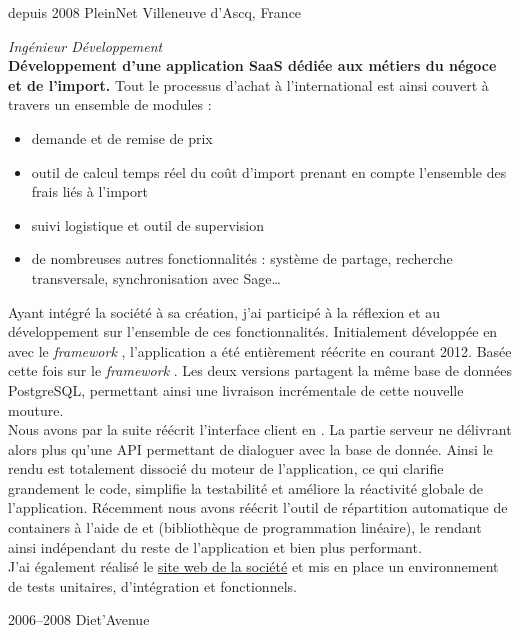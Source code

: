 \documentclass[]{cv} %
\begin{document}
\begin{entrylist}
\entry
{depuis 2008}
{PleinNet}
{Villeneuve d'Ascq, France}
{\emph{Ingénieur Développement}
\vspace{5pt}\\
\textbf{Développement d'une application SaaS dédiée aux métiers du négoce et de l'import.} Tout le processus d'achat à l'international est ainsi couvert à travers un ensemble de modules :
\begin{itemize}
\item demande et de remise de prix
\item outil de calcul temps réel du coût d'import prenant en compte l'ensemble des frais liés à l'import
\item suivi logistique et outil de supervision
\item de nombreuses autres fonctionnalités : système de partage, recherche transversale, synchronisation avec Sage…
\end{itemize}
\vspace{5pt}
Ayant intégré la société à sa création, j'ai participé à la réflexion et au développement sur l'ensemble de ces fonctionnalités. Initialement développée en  avec le \emph{framework} , l'application a été entièrement réécrite en  courant 2012. Basée cette fois sur le \emph{framework} . Les deux versions partagent la même base de données PostgreSQL, permettant ainsi une livraison incrémentale de cette nouvelle mouture.
\vspace{5pt}\\
Nous avons par la suite réécrit l'interface client en . La partie serveur ne délivrant alors plus qu'une API permettant de dialoguer avec la base de donnée. Ainsi le rendu est totalement dissocié du moteur de l'application, ce qui clarifie grandement le code, simplifie la testabilité et améliore la réactivité globale de l'application.
Récemment nous avons réécrit l'outil de répartition automatique de containers à l'aide de  et  (bibliothèque de programmation linéaire), le rendant ainsi indépendant du reste de l'application et bien plus performant.
\vspace{5pt}\\
J'ai également réalisé le \href{http://www.geniustrade.com}{site web de la société} et mis en place un environnement de tests unitaires, d'intégration et fonctionnels.
}
\entry
{2006--2008}
{Diet'Avenue}

\end{entrylist}
\end{document}
